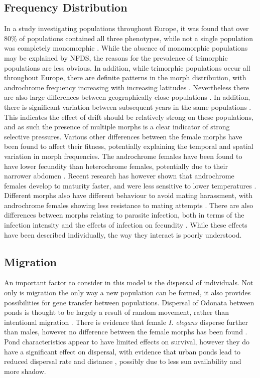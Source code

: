 \documentclass{article}
\begin{document}
\subsection{Frequency Distribution}
In a study investigating populations throughout Europe, it was found that over 80\% of populations contained all three phenotypes, while not a single population was completely monomorphic \cite{Gosden2011}. While the absence of monomorphic populations may be explained by NFDS, the reasons for the prevalence of trimorphic populations are less obvious. In addition, while trimorphic populations occur all throughout Europe, there are definite patterns in the morph distribution, with androchrome frequency increasing with increasing latitudes \cite{Gosden2011}. Nevertheless there are also large differences between geographically close populations \cite{Gosden2011}. In addition, there is significant variation between subsequent years in the same populations \cite{Svensson2005}. This indicates the effect of drift should be relatively strong on these populations, and as such the presence of multiple morphs is a clear indicator of strong selective pressures.
Various other differences between the female morphs have been found to affect their fitness, potentially explaining the temporal and spatial variation in morph frequencies. The androchrome females have been found to have lower fecundity than heterochrome females, potentially due to their narrower abdomen \cite{Gosden2009}. Recent research has however shown that androchrome females develop to maturity faster, and were less sensitive to lower temperatures \cite{Svensson2019}.
Different morphs also have different behaviour to avoid mating harassment, with androchrome females showing less resistance to mating attempts \cite{Gosden2009}. There are also differences between morphs relating to parasite infection, both in terms of the infection intensity and the effects of infection on fecundity \cite{Willink2017}.
While these effects have been described individually, the way they interact is poorly understood.

\subsection{Migration}
An important factor to consider in this model is the dispersal of individuals. Not only is migration the only way a new population can be formed, it also provides possibilities for gene transfer between populations. Dispersal of Odonata between ponds is thought to be largely a result of random movement, rather than intentional migration \cite{conrad2002, Moore1954}.
There is evidence that female \textit{I. elegans} disperse further than males, however no difference between the female morphs has been found \cite{conrad2002}.
Pond characteristics appear to have limited effects on survival, however they do have a significant effect on dispersal, with evidence that urban ponds lead to reduced dispersal rate and distance \cite{Gall2017}, possibly due to less sun availability and more shadow.
\end{document}
